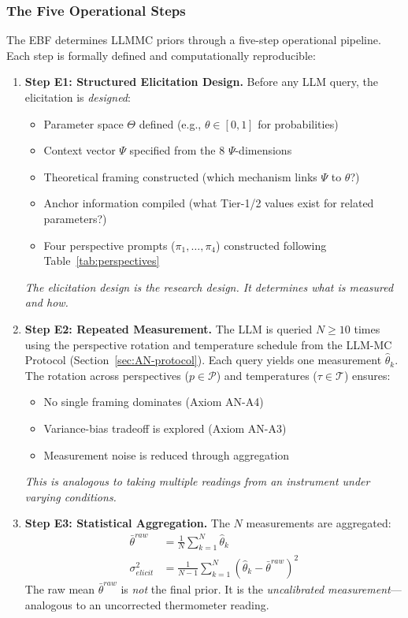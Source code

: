 \subsubsection{The Five Operational Steps}
\label{sec:AN-five-steps}

The EBF determines LLMMC priors through a five-step operational pipeline.
Each step is formally defined and computationally reproducible:

\begin{enumerate}
    \item \textbf{Step E1: Structured Elicitation Design.}
    Before any LLM query, the elicitation is \textit{designed}:
    \begin{itemize}[nosep]
        \item Parameter space $\Theta$ defined (e.g., $\theta \in [0, 1]$ for probabilities)
        \item Context vector $\Psi$ specified from the 8 $\Psi$-dimensions
        \item Theoretical framing constructed (which mechanism links $\Psi$ to $\theta$?)
        \item Anchor information compiled (what Tier-1/2 values exist for related parameters?)
        \item Four perspective prompts ($\pi_1, \ldots, \pi_4$) constructed following Table~\ref{tab:perspectives}
    \end{itemize}
    \textit{The elicitation design is the research design. It determines what is measured and how.}

    \item \textbf{Step E2: Repeated Measurement.}
    The LLM is queried $N \geq 10$ times using the perspective rotation and temperature
    schedule from the LLM-MC Protocol (Section~\ref{sec:AN-protocol}). Each query yields one
    measurement $\hat{\theta}_k$. The rotation across perspectives ($p \in \mathcal{P}$) and
    temperatures ($\tau \in \mathcal{T}$) ensures:
    \begin{itemize}[nosep]
        \item No single framing dominates (Axiom AN-A4)
        \item Variance-bias tradeoff is explored (Axiom AN-A3)
        \item Measurement noise is reduced through aggregation
    \end{itemize}
    \textit{This is analogous to taking multiple readings from an instrument under varying conditions.}

    \item \textbf{Step E3: Statistical Aggregation.}
    The $N$ measurements are aggregated:
    \begin{align}
        \bar{\theta}^{raw} &= \frac{1}{N} \sum_{k=1}^{N} \hat{\theta}_k \label{eq:raw-mean} \\
        \sigma^{2}_{elicit} &= \frac{1}{N-1} \sum_{k=1}^{N} (\hat{\theta}_k - \bar{\theta}^{raw})^2 \label{eq:elicit-var}
    \end{align}
    The raw mean $\bar{\theta}^{raw}$ is \textit{not} the final prior. It is the
    \textit{uncalibrated measurement}---analogous to an uncorrected thermometer reading.


\end{enumerate}
